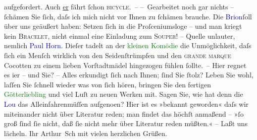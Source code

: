                aufgefordert. Auch \uline{er} fährt ſchon \textsc{bicycle}. –\pend
           \pstart
           – Gearbeitet noch gar nichts – ſchämen Sie ſich, daſs ich mich nicht vor Ihnen zu
               ſchämen brauche.\pend
           \pstart
           Die \textcolor{blue}{Brion}{}\ledrightnote{\textcolor{blue}{Lou Brion}}{ }ſoll über uns geäußert haben: Setzen ſich in die
               Proſceniumsloge – und {\pb}man kriegt kein \textsc{Bracelet}, nicht einmal eine Einladung zum \textsc{Souper}! – Quelle unlauter, nemlich \textcolor{blue}{Paul Horn}{}\ledrightnote{\textcolor{blue}{Paul Horn}}. Dieſer tadelt an der \textcolor{green}{kleinen Komödie}{} die Unmöglichkeit, daſs ſich ein Menſch
               wirklich von den Seidenſtrümpfen und den \textsc{grande marque}
               Cocotten zu einem lieben Vorſtadtmädel hingezogen fühlen ſollte. –\pend
           \pstart
           Hier regnet es i{\geminationm}er – und Sie? – Alles erkundigt ſich
               nach Ihnen; ſind Sie ſtolz? Leben Sie wohl, laſſen Sie ſchnell {\pb}wieder was von ſich hören, bringen Sie den fertigen
                  \textcolor{green}{Götterliebling}{} und viel Luſt
               zu neuen Werken mit. Sagen Sie, wie hat denn die \textcolor{blue}{Lou}{}\ledrightnote{\textcolor{blue}{Lou Brion}} das Alleinfahrenmüſſen aufgeno{\geminationm}en? Hier ist
               es »bekannt geworden« daſs wir miteinander nicht über Literatur reden; man findet das
               höchſt anmaßend – »ſo groß ſind ſie nicht, daß ſie nicht mehr über Literatur reden
               müßten.« – Laßt uns lächeln.\pend
           \pstart Ihr \spacefill\mbox{Arthur Sch} mit vielen herzlichen Grüßen.\pend{}\endnumbering{}  
      